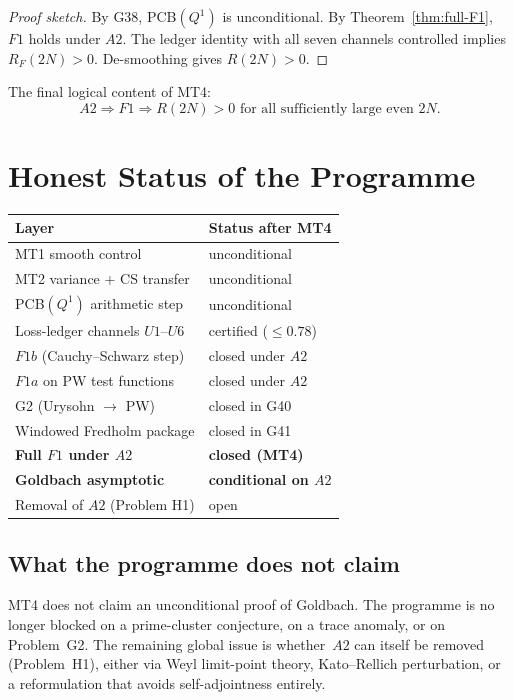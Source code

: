 \documentclass[11pt,a4paper]{article}
\begin{document}
\begin{proof}[Proof sketch]
By G38, PCB$(Q^1)$ is unconditional.  By Theorem~\ref{thm:full-F1}, $F1$ holds under $A2$.  The ledger identity with all seven channels controlled implies $R_F(2N)>0$.  De-smoothing gives $R(2N)>0$.
\end{proof}

The final logical content of MT4:
\[
\boxed{A2 \Longrightarrow F1 \Longrightarrow R(2N)>0 \text{ for all sufficiently large even } 2N.}
\]

\section{Honest Status of the Programme}

\begin{center}
\begin{tabular}{@{}ll@{}}
\toprule
\textbf{Layer} & \textbf{Status after MT4} \\
\midrule
MT1 smooth control & unconditional \\
MT2 variance + CS transfer & unconditional \\
PCB$(Q^1)$ arithmetic step & unconditional \\
Loss-ledger channels $U1$--$U6$ & certified ($\le 0.78$) \\
$F1b$ (Cauchy--Schwarz step) & closed under $A2$ \\
$F1a$ on PW test functions & closed under $A2$ \\
G2 (Urysohn $\to$ PW) & closed in G40 \\
Windowed Fredholm package & closed in G41 \\
\textbf{Full $F1$ under $A2$} & \textbf{closed (MT4)} \\
\textbf{Goldbach asymptotic} & \textbf{conditional on $A2$} \\
Removal of $A2$ (Problem H1) & open \\
\bottomrule
\end{tabular}
\end{center}

\subsection{What the programme does not claim}

MT4 does not claim an unconditional proof of Goldbach.  The programme is no longer blocked on a prime-cluster conjecture, on a trace anomaly, or on Problem~G2.  The remaining global issue is whether~$A2$ can itself be removed (Problem~H1), either via Weyl limit-point theory, Kato--Rellich perturbation, or a reformulation that avoids self-adjointness entirely.
\end{document}
